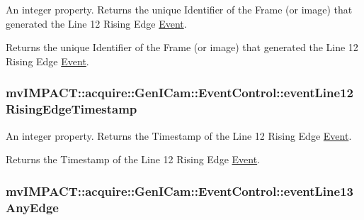 An integer property. Returns the unique Identifier of the Frame (or image) that generated the Line 12 Rising Edge \hyperlink{classmv_i_m_p_a_c_t_1_1acquire_1_1_event}{Event}. 

Returns the unique Identifier of the Frame (or image) that generated the Line 12 Rising Edge \hyperlink{classmv_i_m_p_a_c_t_1_1acquire_1_1_event}{Event}. \hypertarget{classmv_i_m_p_a_c_t_1_1acquire_1_1_gen_i_cam_1_1_event_control_aef9c079af01791b023f8ce0e88c9ee31}{
\subsubsection[{event\+Line12\+Rising\+Edge\+Timestamp}]{ mv\+I\+M\+P\+A\+C\+T\+::acquire\+::\+Gen\+I\+Cam\+::\+Event\+Control\+::event\+Line12\+Rising\+Edge\+Timestamp}}\label{classmv_i_m_p_a_c_t_1_1acquire_1_1_gen_i_cam_1_1_event_control_aef9c079af01791b023f8ce0e88c9ee31}


An integer property. Returns the Timestamp of the Line 12 Rising Edge \hyperlink{classmv_i_m_p_a_c_t_1_1acquire_1_1_event}{Event}. 

Returns the Timestamp of the Line 12 Rising Edge \hyperlink{classmv_i_m_p_a_c_t_1_1acquire_1_1_event}{Event}. \hypertarget{classmv_i_m_p_a_c_t_1_1acquire_1_1_gen_i_cam_1_1_event_control_ae89a07545f5875608952afd69c3e1ed4}{
\subsubsection[{event\+Line13\+Any\+Edge}]{ mv\+I\+M\+P\+A\+C\+T\+::acquire\+::\+Gen\+I\+Cam\+::\+Event\+Control\+::event\+Line13\+Any\+Edge}}\label{classmv_i_m_p_a_c_t_1_1acquire_1_1_gen_i_cam_1_1_event_control_ae89a07545f5875608952afd69c3e1ed4}


